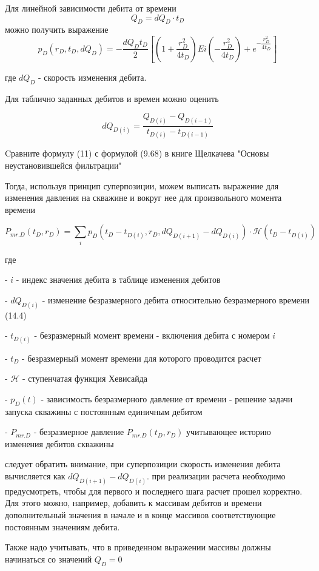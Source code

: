 Для линейной зависимости дебита от времени 
$$
Q_D = dQ_D \cdot t_D 
$$
можно получить выражение
$$
p_D(r_D,t_D, dQ_D) =-\frac{dQ_D t_D }{2} \left[ \left( 1+ \frac{r_D^2}{4 t_D} \right) Ei \left(- \dfrac{r_D^2}{4t_D} \right) + e^{-\dfrac{r_D^2}{4t_D}} \right] $$ 

где $dQ_D$ - скорость изменения дебита.

Для таблично заданных дебитов и времен можно оценить 

$$
dQ_{D(i)} = \dfrac{Q_{D(i)}-Q_{D(i-1)}}{t_{D(i)} - t_{D(i-1)} } 
$$

Cравните формулу (11) с формулой (9.68) в книге Щелкачева "Основы неустановившейся фильтрации"

Тогда, используя принцип суперпозиции, можем выписать выражение для изменения давления на скважине и вокруг нее для произвольного момента времени

$$P_{mr.D}(t_D, r_D) = \sum_i  p_D\left(t_D-t_{D(i)}, r_D, dQ_{D(i+1)} - dQ_{D(i)}\right)\cdot \mathcal{H}(t_D-t_{D(i)}) $$

где

- $i$ - индекс значения дебита в таблице изменения дебитов

- $dQ_{D(i)}$ - изменение безразмерного дебита относительно безразмерного времени (14.4) 

- $t_{D(i)}$ - безразмерный момент времени - включения дебита с номером $i$

- $t_{D}$ - безразмерный момент времени для которого проводится расчет

- $\mathcal{H}$ - ступенчатая функция Хевисайда

- $p_D\left(t\right)$ - зависимость безразмерного давление от времени - решение задачи запуска скважины с постоянным единичным дебитом

- $P_{mr.D} $ - безразмерное давление $P_{mr.D}(t_D, r_D)$ учитывающее историю изменения дебитов скважины

следует обратить внимание, при суперпозиции скорость изменения дебита вычисляется как $dQ_{D(i+1)} - dQ_{D(i)}$.  при реализации расчета необходимо предусмотреть, чтобы для первого и последнего шага расчет прошел корректно. Для этого можно, например, добавить к массивам дебитов и времени дополнительный значения в начале и в конце массивов соответствующие постоянным значениям дебита. 

Также надо учитывать, что в приведенном выражении массивы должны начинаться со значений $Q_D=0$





